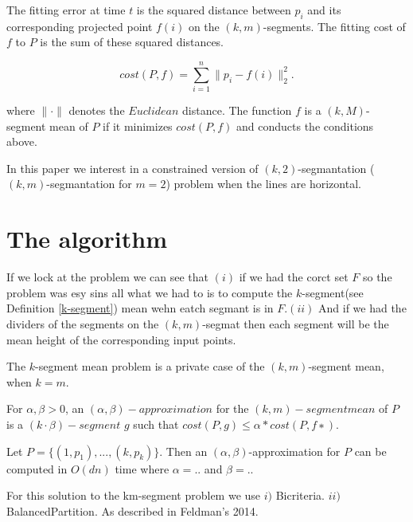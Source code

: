 \documentclass[12pt]{llncs}
\begin{document}
\begin{definition}
The fitting error at time $t$ is the squared distance
between $p_i$ and its corresponding projected point $f(i)$ on the $(k,m)$-segments.
The fitting cost of $f$ to $P$ is the sum of these squared distances.

\[
cost(P,f) = \sum_{i=1}^{n}\parallel p_i-f(i)\parallel_{2}^{2}.
\]

where $\parallel\cdot\parallel$ denotes the $Euclidean$ distance. 
The function $f$ is a $(k,M)$-segment mean of $P$ if it minimizes $cost(P,f)$ and conducts the conditions above.
\end{definition}

In this paper we interest in a constrained version of $(k,2)$-segmantation
($(k,m)$-segmantation for $m=2$) problem when the lines are horizontal.

\section{The algorithm}
If we lock at the problem we can see that $(i)$ if we had the corct set $F$
so the problem was esy sins all what we had to is to compute the $k$-segment(see Definition \ref{k-segment}) mean wehn eatch segmant is in $F$.$(ii)$ And if we had the dividers of the segments on the $(k,m)$-segmat then each segment
will be the mean height of the corresponding input points. 

\begin{definition} \label{k-segment}
The $k$-segment mean problem is a private case of the $(k,m)$-segment mean, when $k = m$.

\end{definition}


\begin{definition}
For $ \alpha, \beta > 0$, an $(\alpha, \beta)-approximation$ for the $(k,m)-segment mean$
 of $P$ is a $(k · β)-segment$ $ g$ such that $cost(P, g) \leq \alpha \ast cost(P, f ∗).$

\end{definition}


\begin{theorem}
Let $P=\lbrace(1, p_1),...,(k, p_k)\rbrace$. Then an $(\alpha,\beta)$-approximation for $P$ can be computed in $O(dn)$ time where $\alpha=..$ and $\beta=..$

\end{theorem}

For this solution to the km-segment problem we use 
$i)$ Bicriteria.
$ii)$ BalancedPartition.
As described in Feldman's 2014.
\end{document}
